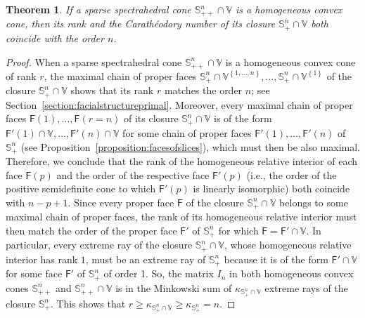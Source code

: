 \documentclass[oneside]{amsart}
\theoremstyle{plain}
\newtheorem{theorem}{Theorem}[section]
\theoremstyle{definition}
\theoremstyle{remark}
\numberwithin{equation}{section}
\begin{document}
\begin{theorem}\label{theorem:sparsespectrahedralcone}
If a sparse spectrahedral cone $\mathbb{S}^{n}_{++} \cap \mathbb{V}$ is a
homogeneous convex cone, then its rank and the Carath\'eodory number of its
closure $\mathbb{S}^{n}_{+} \cap \mathbb{V}$ both coincide with the order
$n$.
\end{theorem}
\begin{proof}
When a sparse spectrahedral cone $\mathbb{S}^{n}_{++} \cap \mathbb{V}$ is a
homogeneous convex cone of rank $r$, the maximal chain of proper faces
$\mathbb{S}^{n}_{+} \cap \mathbb{V}^{\left\{1, \dotsc, n\right\}}, \dotsc,
\mathbb{S}^{n}_{+} \cap \mathbb{V}^{\left\{1\right\}}$ of the closure
$\mathbb{S}^{n}_{+} \cap \mathbb{V}$ shows that its rank $r$ matches the
order $n$; see Section~\ref{section:facialstructureprimal}. Moreover, every
maximal chain of proper faces $\mathsf{F}(1), \dotsc, \mathsf{F}(r = n)$ of
its closure $\mathbb{S}^{n}_{+} \cap \mathbb{V}$ is of the form
$\mathsf{F}'(1) \cap \mathbb{V}, \dotsc, \mathsf{F}'(n) \cap \mathbb{V}$
for some chain of proper faces $\mathsf{F}'(1), \dotsc, \mathsf{F}'(n)$ of
$\mathbb{S}^{n}_{+}$ (see Proposition~\ref{proposition:facesofslices}),
which must then be also maximal. Therefore, we conclude that the rank of
the homogeneous relative interior of each face $\mathsf{F}(p)$ and the
order of the respective face $\mathsf{F}'(p)$ (i.e., the order of the
positive semidefinite cone to which $\mathsf{F}'(p)$ is linearly
isomorphic) both coincide with $n-p+1$. Since every proper face
$\mathsf{F}$ of the closure $\mathbb{S}^{n}_{+} \cap \mathbb{V}$ belongs to
some maximal chain of proper faces, the rank of its homogeneous relative
interior must then match the order of the proper face $\mathsf{F}'$ of
$\mathbb{S}^{n}_{+}$ for which $\mathsf{F} = \mathsf{F}' \cap \mathbb{V}$.
In particular, every extreme ray of the closure $\mathbb{S}^{n}_{+} \cap
\mathbb{V}$, whose homogeneous relative interior has rank $1$, must be an
extreme ray of $\mathbb{S}^{n}_{+}$ because it is of the form $\mathsf{F}'
\cap \mathbb{V}$ for some face $\mathsf{F}'$ of $\mathbb{S}^{n}_{+}$ of
order 1. So, the matrix $I_{n}$ in both homogeneous convex cones
$\mathbb{S}^{n}_{++}$ and $\mathbb{S}^{n}_{++} \cap \mathbb{V}$ is in the
Minkowski sum of $\kappa_{\mathbb{S}^{n}_{+} \cap \mathbb{V}}$ extreme rays
of the closure $\mathbb{S}^{n}_{+}$. This shows that $r \geq
\kappa_{\mathbb{S}^{n}_{+} \cap \mathbb{V}} \geq
\kappa_{\mathbb{S}^{n}_{+}} = n$.
\end{proof}
\end{document}
